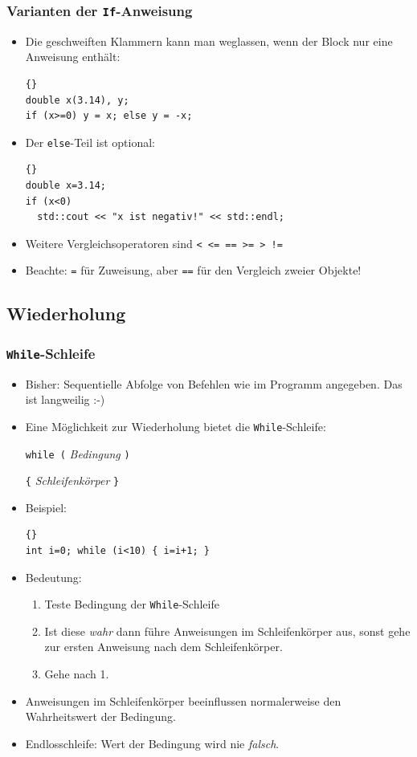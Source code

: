 \documentclass[ignorenonframetext,12pt]{beamer}
\theoremstyle{definition}
\theoremstyle{definition}
\begin{document}
\begin{frame}[fragile]
\frametitle{Varianten der \lstinline{If}-Anweisung}
\begin{itemize}
\item Die geschweiften Klammern kann man weglassen, wenn der Block nur
  eine Anweisung enthält:
{\scriptsize\begin{lstlisting}{}
double x(3.14), y;
if (x>=0) y = x; else y = -x;
\end{lstlisting}}
\item Der \lstinline{else}-Teil ist optional:
{\scriptsize\begin{lstlisting}{}
double x=3.14;
if (x<0)
  std::cout << "x ist negativ!" << std::endl;
\end{lstlisting}}
\item Weitere Vergleichsoperatoren sind \lstinline{< <= == >= > !=}\\
\item Beachte: \lstinline{=} für Zuweisung, aber \lstinline{==} für den
Vergleich zweier Objekte!
\end{itemize}
\end{frame}


\subsection{Wiederholung}

\begin{frame}[fragile]
\frametitle{\lstinline{While}-Schleife}
\begin{itemize}
\item Bisher: Sequentielle Abfolge von Befehlen wie im Programm
  angegeben. Das ist langweilig :-)
\item Eine Möglichkeit zur Wiederholung bietet die
  \lstinline{While}-Schleife:

\lstinline{while (} \textsl{Bedingung} \lstinline{)}

\lstinline!{! \textsl{Schleifenkörper} \lstinline!}!

\item Beispiel:
{\scriptsize\begin{lstlisting}{}
int i=0; while (i<10) { i=i+1; }
\end{lstlisting}}

\item Bedeutung:
\begin{enumerate}
\item Teste Bedingung der \lstinline{While}-Schleife
\item Ist diese \textsl{wahr} dann führe Anweisungen im
  Schleifenkörper aus, sonst gehe zur ersten Anweisung nach dem
  Schleifenkörper.
\item Gehe nach 1.
\end{enumerate}
\item Anweisungen im Schleifenkörper beeinflussen normalerweise den Wahrheitswert der
  Bedingung.
\item Endlosschleife: Wert der Bedingung wird nie \textsl{falsch}.
\end{itemize}
\end{frame}
\end{document}
